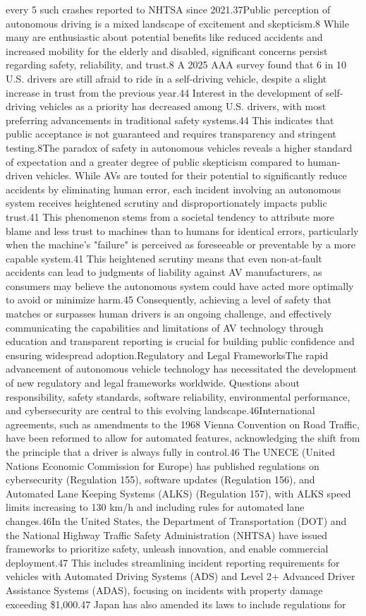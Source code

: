 every 5 such crashes reported to NHTSA since 2021.37Public perception of autonomous driving is a mixed landscape of excitement and skepticism.8 While many are enthusiastic about potential benefits like reduced accidents and increased mobility for the elderly and disabled, significant concerns persist regarding safety, reliability, and trust.8 A 2025 AAA survey found that 6 in 10 U.S. drivers are still afraid to ride in a self-driving vehicle, despite a slight increase in trust from the previous year.44 Interest in the development of self-driving vehicles as a priority has decreased among U.S. drivers, with most preferring advancements in traditional safety systems.44 This indicates that public acceptance is not guaranteed and requires transparency and stringent testing.8The paradox of safety in autonomous vehicles reveals a higher standard of expectation and a greater degree of public skepticism compared to human-driven vehicles. While AVs are touted for their potential to significantly reduce accidents by eliminating human error, each incident involving an autonomous system receives heightened scrutiny and disproportionately impacts public trust.41 This phenomenon stems from a societal tendency to attribute more blame and less trust to machines than to humans for identical errors, particularly when the machine's "failure" is perceived as foreseeable or preventable by a more capable system.41 This heightened scrutiny means that even non-at-fault accidents can lead to judgments of liability against AV manufacturers, as consumers may believe the autonomous system could have acted more optimally to avoid or minimize harm.45 Consequently, achieving a level of safety that matches or surpasses human drivers is an ongoing challenge, and effectively communicating the capabilities and limitations of AV technology through education and transparent reporting is crucial for building public confidence and ensuring widespread adoption.Regulatory and Legal FrameworksThe rapid advancement of autonomous vehicle technology has necessitated the development of new regulatory and legal frameworks worldwide. Questions about responsibility, safety standards, software reliability, environmental performance, and cybersecurity are central to this evolving landscape.46International agreements, such as amendments to the 1968 Vienna Convention on Road Traffic, have been reformed to allow for automated features, acknowledging the shift from the principle that a driver is always fully in control.46 The UNECE (United Nations Economic Commission for Europe) has published regulations on cybersecurity (Regulation 155), software updates (Regulation 156), and Automated Lane Keeping Systems (ALKS) (Regulation 157), with ALKS speed limits increasing to 130 km/h and including rules for automated lane changes.46In the United States, the Department of Transportation (DOT) and the National Highway Traffic Safety Administration (NHTSA) have issued frameworks to prioritize safety, unleash innovation, and enable commercial deployment.47 This includes streamlining incident reporting requirements for vehicles with Automated Driving Systems (ADS) and Level 2+ Advanced Driver Assistance Systems (ADAS), focusing on incidents with property damage exceeding \$1,000.47 Japan has also amended its laws to include regulations for 